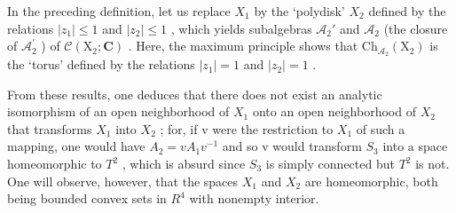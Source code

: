 In the preceding definition, let us replace \(X_1\) by the `polydisk' \(X_2\) defined by the relations \(|z_1| \leqslant 1\) and \(|z_2| \leqslant 1\) , which yields subalgebras \(\mathscr{A}_2'\) and \(\mathscr{A}_2\) (the closure of \(\mathcal{A}_2^{\prime}\) ) of \(\mathcal{C}(\mathrm{X}_2; \mathbf{C})\) . Here, the maximum principle shows that \(\mathrm{Ch}_{\mathcal{A}_2}(\mathrm{X}_2)\) is the `torus' defined by the relations \(|z_1| = 1\) and \(|z_2| = 1\) .

From these results, one deduces that there does not exist an analytic isomorphism of an open neighborhood of \(X_{1}\) onto an open neighborhood of \(X_{2}\) that transforms \(X_{1}\) into \(X_{2}\) ; for, if v were the restriction to \(X_{1}\) of such a mapping, one would have \(A_{2}=vA_{1}v^{-1}\) and so v would transform \(S_{3}\) into a space homeomorphic to \(T^{2}\) , which is absurd since \(S_{3}\) is simply connected but \(T^{2}\) is not. One will observe, however, that the spaces \(X_{1}\) and \(X_{2}\) are homeomorphic, both being bounded convex sets in \(R^{4}\) with nonempty interior.

